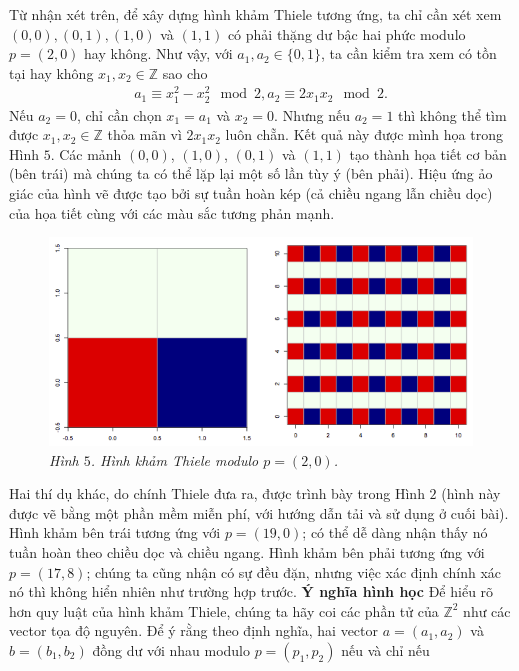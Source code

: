 \begin{multicols}{2}
	\vskip 0.1cm
	Từ nhận xét trên, để xây dựng hình khảm Thiele tương ứng, ta chỉ cần xét xem $(0, 0), (0, 1), (1, 0)$ và $(1, 1)$ có phải thặng dư bậc hai phức modulo $p = (2, 0)$ hay không.
	\vskip 0.1cm
	Như vậy, với $a_1, a_2 \in \{0, 1\}$, ta cần kiểm tra xem có tồn tại hay không $x_1, x_2 \in \mathbb Z$ sao cho
	\begin{align*}
		a_1 \equiv x_1^2 - x_2^2 \mod{2}, a_2 \equiv 2 x_1 x_2 \mod{2}.
	\end{align*}
	Nếu $a_2 = 0$, chỉ cần chọn $x_1 = a_1$ và $x_2 = 0$. Nhưng nếu $a_2 = 1$ thì không thể tìm được $x_1, x_2 \in \mathbb Z$ thỏa mãn vì $2 x_1 x_2$ luôn chẵn.
	\vskip 0.1cm
	Kết quả này được mình họa trong Hình $5$. Các mảnh $(0, 0)$, $(1, 0)$, $(0, 1)$ và $(1, 1)$ tạo thành họa tiết cơ bản (bên trái) mà chúng ta có thể lặp lại một số lần tùy ý (bên phải). Hiệu ứng ảo giác của hình vẽ được tạo bởi sự tuần hoàn kép (cả chiều ngang lẫn chiều dọc) của họa tiết cùng với các màu sắc tương phản mạnh.
	\begin{figure}[H]
		\vspace*{-5pt}
		\centering
		\captionsetup{labelformat= empty, justification=centering}
		\includegraphics[width= 1\linewidth]{mosaique-8.png}
		\caption{\small\textit{\color{toanhocdoisong}Hình $5$. Hình khảm Thiele modulo $p = (2, 0)$.}}
		\vspace*{-10pt}
	\end{figure}
	Hai thí dụ khác, do chính Thiele đưa ra, được trình bày trong Hình $2$ (hình này được vẽ bằng một phần mềm miễn phí, với hướng dẫn tải và sử dụng ở cuối bài). Hình khảm bên trái tương ứng với $p = (19, 0)$; có thể dễ dàng nhận thấy nó tuần hoàn theo chiều dọc và chiều ngang. Hình khảm bên phải tương ứng với $p = (17, 8)$; chúng ta cũng nhận có sự đều đặn, nhưng việc xác định chính xác nó thì không hiển nhiên như trường hợp trước.
	\vskip 0.1cm
	\textbf{\color{toanhocdoisong}Ý nghĩa hình học}
	\vskip 0.1cm
	Để hiểu rõ hơn quy luật của hình khảm Thiele, chúng ta hãy coi các phần tử của $\mathbb Z^2$ như các vector tọa độ nguyên. Để ý rằng theo định nghĩa, hai vector $a = (a_1, a_2)$ và $b = (b_1, b_2)$ đồng dư với nhau modulo $p = (p_1, p_2)$ nếu và chỉ nếu

\end{multicols}

